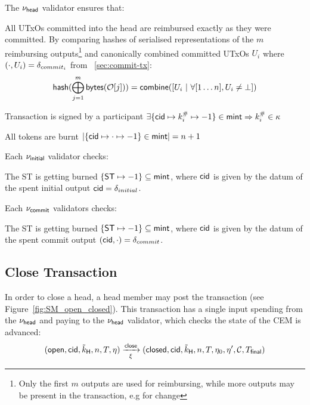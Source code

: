 \noindent The $\nu_\mathsf{head}$ validator ensures that:
\begin{menumerate}
  \item All UTxOs committed into the head are reimbursed exactly as they were
  committed. By comparing hashes of serialised representations of the $m$
  reimbursing outputs\footnote{Only the first $m$ outputs are used for
    reimbursing, while more outputs may be present in the transaction, e.g for
    change} and canonically combined committed UTxOs $U_{i}$ where $(\cdot, U_{i}) = \delta_{commit_{i}}$ from \mtxCom{}~\ref{sec:commit-tx}:
  \[
    \mathsf{hash}(\bigoplus_{j=1}^{m} \mathsf{bytes}(\mathcal{O}[j])) = \mathsf{combine}([U_{i} ~ | ~ \forall [1\dots n], U_{i} \neq \bot])
  \]

  \item Transaction is signed by a participant $\exists \{\mathsf{cid} \mapsto k^{\#}_{i} \mapsto -1\} \in \mathsf{mint} \Rightarrow k^{\#}_{i} \in \kappa$
  \item All tokens are burnt
  $|\{\mathsf{cid} \mapsto \cdot \mapsto -1\} \in \mathsf{mint}| = n + 1$
\end{menumerate}

\noindent Each $\nu_\mathsf{initial}$ validator checks:
\begin{menumerate}
  \item The ST is getting burned $\{\mathsf{ST} \mapsto -1\} \subseteq \mathsf{mint}$, where
  $\mathsf{cid}$ is given by the datum of the spent initial output
  $\mathsf{cid} = \delta_{initial}$.
\end{menumerate}

\noindent Each $\nu_\mathsf{commit}$ validators checks:
\begin{menumerate}
  \item The ST is getting burned $\{\mathsf{ST} \mapsto -1\} \subseteq \mathsf{mint}$, where
  $\mathsf{cid}$ is given by the datum of the spent commit output
  $(\mathsf{cid},\cdot) = \delta_{commit}$.
\end{menumerate}

\subsection{Close Transaction}\label{sec:close-tx}



In order to close a head, a head member may post the \mtxClose{} transaction
(see Figure~\ref{fig:SM_open_closed}). This transaction has a single input
spending from the $\nu_\mathsf{head}$ and paying to the $\nu_\mathsf{head}$ validator, which checks
the state of the CEM is advanced:
\[
  (\mathsf{open},\mathsf{cid},\tilde{k}_{\mathsf{H}},n,T,\eta) \xrightarrow[\xi]{\mathsf{close}} (\mathsf{closed},\mathsf{cid},\tilde{k}_{\mathsf{H}},n,T,\eta_0,\eta',\mathcal{C},T_{\mathsf{final}})
\]

